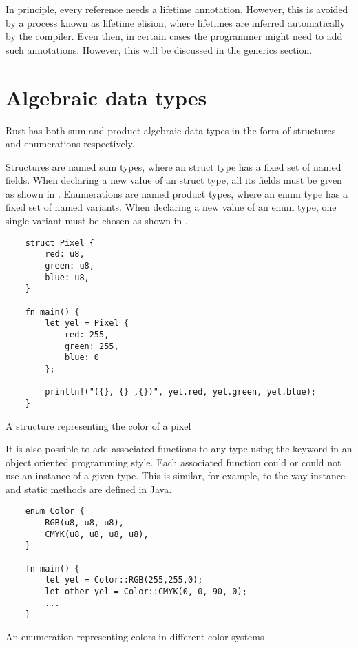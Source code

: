 In principle, every reference needs a lifetime annotation. However, this is
avoided by a process known as lifetime elision, where lifetimes are inferred
automatically by the compiler. Even then, in certain cases the programmer might
need to add such annotations. However, this will be discussed in the generics
section.

\section{Algebraic data types}

Rust has both sum and product algebraic data types in the form of structures and
enumerations respectively.

Structures are named sum types, where an struct type has a fixed set of named
fields. When declaring a new value of an struct type, all its fields must be
given as shown in . Enumerations are named product types, where
an enum type has a fixed set of named variants. When declaring a new value of an
enum type, one single variant must be chosen as shown in .

\begin{listing}[h]
	\begin{verbatim}
    struct Pixel {
        red: u8,
        green: u8,
        blue: u8,
    }

    fn main() {
        let yel = Pixel {
            red: 255,
            green: 255,
            blue: 0
        };

        println!("({}, {} ,{})", yel.red, yel.green, yel.blue);
    }
    \end{verbatim}
  \caption{A structure representing the color of a pixel}
  \label{lst:struct}
\end{listing}

It is also possible to add associated functions to any type using the
 keyword in an object oriented programming style. Each associated
function could or could not use an instance of a given type. This is similar,
for example, to the way instance and static methods are defined in Java.

\begin{listing}[h]
	\begin{verbatim}
    enum Color {
        RGB(u8, u8, u8),
        CMYK(u8, u8, u8, u8),
    }

    fn main() {
        let yel = Color::RGB(255,255,0);
        let other_yel = Color::CMYK(0, 0, 90, 0);
        ...
    }
    \end{verbatim}
  \caption{An enumeration representing colors in different color systems}
  \label{lst:enum}
\end{listing}

